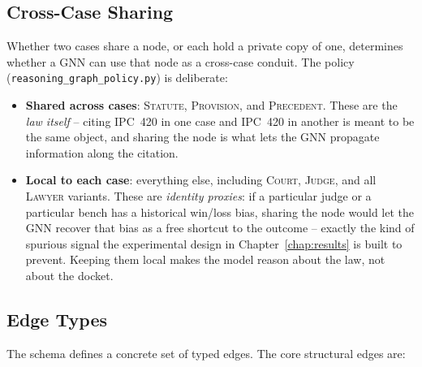 \subsection{Cross-Case Sharing}

Whether two cases share a node, or each hold a private copy of one,
determines whether a GNN can use that node as a cross-case conduit.
The policy (\texttt{reasoning\_graph\_policy.py}) is deliberate:

\begin{itemize}
  \item \textbf{Shared across cases}: \textsc{Statute},
    \textsc{Provision}, and \textsc{Precedent}. These are the
    \emph{law itself} -- citing IPC~420 in one case and IPC~420 in
    another is meant to be the same object, and sharing the node is
    what lets the GNN propagate information along the citation.
  \item \textbf{Local to each case}: everything else, including
    \textsc{Court}, \textsc{Judge}, and all \textsc{Lawyer}
    variants. These are \emph{identity proxies}: if a particular
    judge or a particular bench has a historical win/loss bias,
    sharing the node would let the GNN recover that bias as a free
    shortcut to the outcome -- exactly the kind of spurious signal
    the experimental design in Chapter~\ref{chap:results} is built
    to prevent. Keeping them local makes the model reason about the
    law, not about the docket.
\end{itemize}

\subsection{Edge Types}

The schema defines a concrete set of typed edges. The core structural
edges are:

